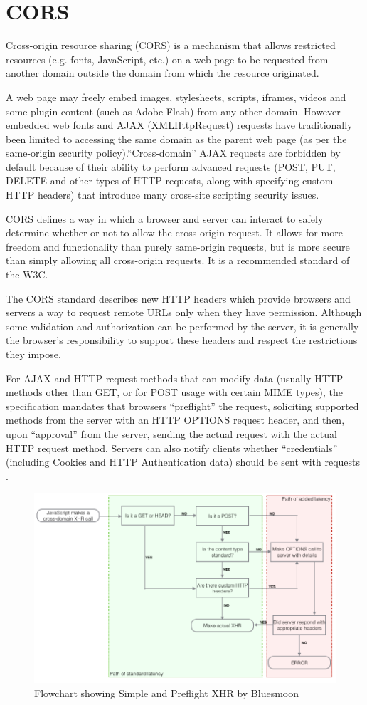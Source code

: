 \section{CORS}
\label{subsec:S3_cors}

Cross-origin resource sharing (CORS) is a mechanism that allows restricted resources (e.g. fonts, JavaScript, etc.) on a web page to be requested from another domain outside the domain from which the resource originated.

A web page may freely embed images, stylesheets, scripts, iframes, videos and some plugin content (such as Adobe Flash) from any other domain. However embedded web fonts and AJAX (XMLHttpRequest) requests have traditionally been limited to accessing the same domain as the parent web page (as per the same-origin security policy).``Cross-domain'' AJAX requests are forbidden by default because of their ability to perform advanced requests (POST, PUT, DELETE and other types of HTTP requests, along with specifying custom HTTP headers) that introduce many cross-site scripting security issues.

CORS defines a way in which a browser and server can interact to safely determine whether or not to allow the cross-origin request. It allows for more freedom and functionality than purely same-origin requests, but is more secure than simply allowing all cross-origin requests. It is a recommended standard of the W3C.

The CORS standard describes new HTTP headers which provide browsers and servers a way to request remote URLs only when they have permission. Although some validation and authorization can be performed by the server, it is generally the browser's responsibility to support these headers and respect the restrictions they impose.

For AJAX and HTTP request methods that can modify data (usually HTTP methods other than GET, or for POST usage with certain MIME types), the specification mandates that browsers ``preflight'' the request, soliciting supported methods from the server with an HTTP OPTIONS request header, and then, upon ``approval'' from the server, sending the actual request with the actual HTTP request method. Servers can also notify clients whether ``credentials'' (including Cookies and HTTP Authentication data) should be sent with requests \cite{s3_cors}. 

\begin {figure}[h]
\graphicspath{{images/chapter_s3/}}
\includegraphics[width=\textwidth]{cors}
\caption{Flowchart showing Simple and Preflight XHR by Bluesmoon}
\end {figure}

